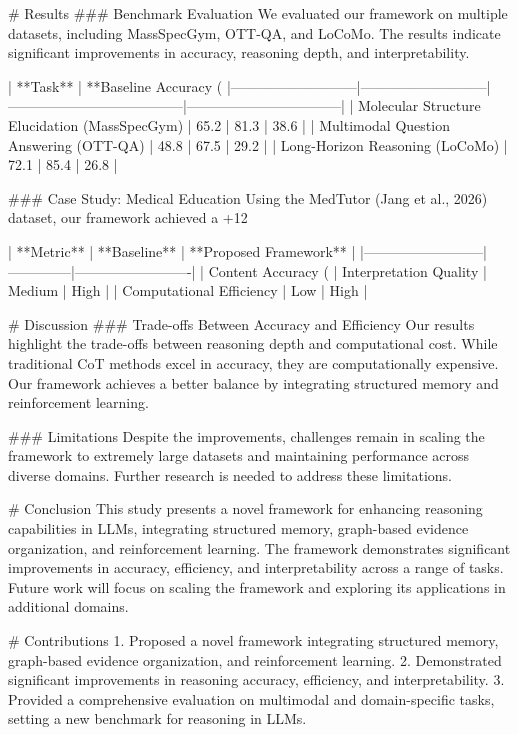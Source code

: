 # Results
### Benchmark Evaluation
We evaluated our framework on multiple datasets, including MassSpecGym, OTT-QA, and LoCoMo. The results indicate significant improvements in accuracy, reasoning depth, and interpretability.

| **Task**                  | **Baseline Accuracy (%
|---------------------------|---------------------------|--------------------------------------|---------------------------------|
| Molecular Structure Elucidation (MassSpecGym) | 65.2                         | 81.3                                | 38.6                            |
| Multimodal Question Answering (OTT-QA)       | 48.8                         | 67.5                                | 29.2                            |
| Long-Horizon Reasoning (LoCoMo)              | 72.1                         | 85.4                                | 26.8                            |

### Case Study: Medical Education
Using the MedTutor (Jang et al., 2026) dataset, our framework achieved a +12%

| **Metric**              | **Baseline** | **Proposed Framework** |
|--------------------------|--------------|-------------------------|
| Content Accuracy (%
| Interpretation Quality   | Medium       | High                   |
| Computational Efficiency | Low          | High                   |

# Discussion
### Trade-offs Between Accuracy and Efficiency
Our results highlight the trade-offs between reasoning depth and computational cost. While traditional CoT methods excel in accuracy, they are computationally expensive. Our framework achieves a better balance by integrating structured memory and reinforcement learning.

### Limitations
Despite the improvements, challenges remain in scaling the framework to extremely large datasets and maintaining performance across diverse domains. Further research is needed to address these limitations.

# Conclusion
This study presents a novel framework for enhancing reasoning capabilities in LLMs, integrating structured memory, graph-based evidence organization, and reinforcement learning. The framework demonstrates significant improvements in accuracy, efficiency, and interpretability across a range of tasks. Future work will focus on scaling the framework and exploring its applications in additional domains.

# Contributions
1. Proposed a novel framework integrating structured memory, graph-based evidence organization, and reinforcement learning.
2. Demonstrated significant improvements in reasoning accuracy, efficiency, and interpretability.
3. Provided a comprehensive evaluation on multimodal and domain-specific tasks, setting a new benchmark for reasoning in LLMs. 

